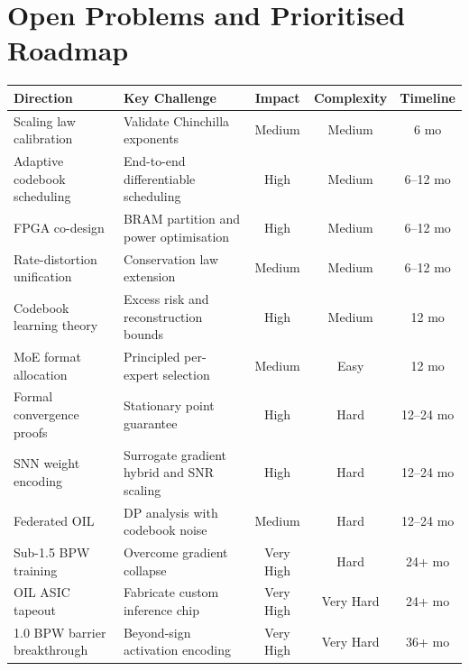 \section{Open Problems and Prioritised Roadmap}
\label{sec:open_final}
\begin{center}
\begin{tabular}{lp{4cm}ccc}
\toprule
\textbf{Direction} & \textbf{Key Challenge} &
\textbf{Impact} & \textbf{Complexity} & \textbf{Timeline} \\
\midrule
Scaling law calibration &
  Validate Chinchilla exponents &
  Medium & Medium & 6 mo \\
Adaptive codebook scheduling &
  End-to-end differentiable scheduling &
  High & Medium & 6--12 mo \\
FPGA co-design &
  BRAM partition and power optimisation &
  High & Medium & 6--12 mo \\
Rate-distortion unification &
  Conservation law extension &
  Medium & Medium & 6--12 mo \\
Codebook learning theory &
  Excess risk and reconstruction bounds &
  High & Medium & 12 mo \\
MoE format allocation &
  Principled per-expert selection &
  Medium & Easy & 12 mo \\
Formal convergence proofs &
  Stationary point guarantee &
  High & Hard & 12--24 mo \\
SNN weight encoding &
  Surrogate gradient hybrid and SNR scaling &
  High & Hard & 12--24 mo \\
Federated OIL &
  DP analysis with codebook noise &
  Medium & Hard & 12--24 mo \\
Sub-1.5 BPW training &
  Overcome gradient collapse &
  Very High & Hard & 24+ mo \\
OIL ASIC tapeout &
  Fabricate custom inference chip &
  Very High & Very Hard & 24+ mo \\
1.0 BPW barrier breakthrough &
  Beyond-sign activation encoding &
  Very High & Very Hard & 36+ mo \\
\bottomrule
\end{tabular}
\caption{Research roadmap ordered by estimated timeline.}
\label{tab:research_roadmap}
\end{center}
